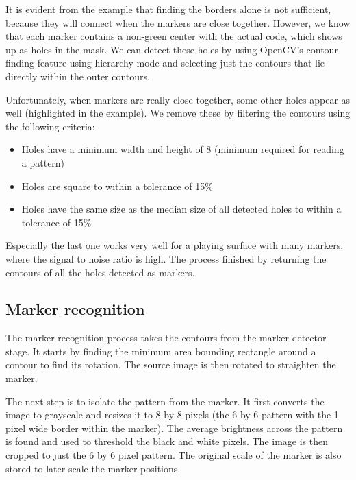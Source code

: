             It is evident from the example that finding the borders alone is not
            sufficient, because they will connect when the markers are close
            together. However, we know that each marker contains a non-green
            center with the actual code, which shows up as holes in the mask. We
            can detect these holes by using OpenCV's contour finding feature
            using hierarchy mode and selecting just the contours that lie
            directly within the outer contours.

            Unfortunately, when markers are really close together, some other
            holes appear as well (highlighted in the example). We remove these
            by filtering the contours using the following criteria:

            \begin{itemize}
                \item Holes have a minimum width and height of 8 (minimum
                required for reading a pattern)
                \item Holes are square to within a tolerance of 15\%
                \item Holes have the same size as the median size of all
                detected holes to within a tolerance of 15\%
            \end{itemize}

            Especially the last one works very well for a playing surface with
            many markers, where the signal to noise ratio is high. The process
            finished by returning the contours of all the holes detected as
            markers.

        \subsection{Marker recognition}
            The marker recognition process takes the contours from the marker
            detector stage. It starts by finding the minimum area bounding
            rectangle around a contour to find its rotation. The source image is
            then rotated to straighten the marker.

            The next step is to isolate the pattern from the marker. It first
            converts the image to grayscale and resizes it to 8 by 8 pixels (the
            6 by 6 pattern with the 1 pixel wide border within the marker). The
            average brightness across the pattern is found and used to threshold
            the black and white pixels. The image is then cropped to just the 6
            by 6 pixel pattern. The original scale of the marker is also stored
            to later scale the marker positions.

